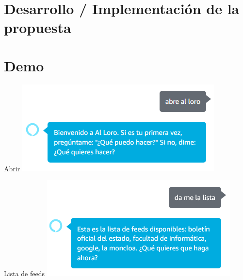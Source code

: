 \documentclass{beamer}
\begin{document}
  \section{Desarrollo / Implementación de la propuesta}
  
  \section[Demo - Skill]{Demo}

  \begin{frame}{Abrir}
    \includegraphics[width=\textwidth]{abrir.png}
  \end{frame}

  \begin{frame}{Lista de feeds}
    \includegraphics[width=\textwidth]{lista-feeds.png}
  \end{frame}
 
\end{document}
